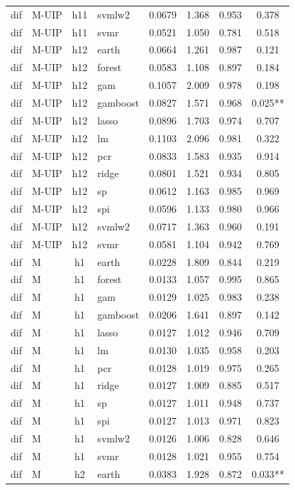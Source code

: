 \begin{ThreePartTable}
\begin{longtable}[t]{llclcccc}
dif & M-UIP & h11 & svmlw2 & 0.0679 & 1.368 & 0.953 & 0.378\\
dif & M-UIP & h11 & svmr & 0.0521 & 1.050 & 0.781 & 0.518\\
\addlinespace
dif & M-UIP & h12 & earth & 0.0664 & 1.261 & 0.987 & 0.121\\
dif & M-UIP & h12 & forest & 0.0583 & 1.108 & 0.897 & 0.184\\
dif & M-UIP & h12 & gam & 0.1057 & 2.009 & 0.978 & 0.198\\
dif & M-UIP & h12 & gamboost & 0.0827 & 1.571 & 0.968 & 0.025**\\
dif & M-UIP & h12 & lasso & 0.0896 & 1.703 & 0.974 & 0.707\\
dif & M-UIP & h12 & lm & 0.1103 & 2.096 & 0.981 & 0.322\\
dif & M-UIP & h12 & pcr & 0.0833 & 1.583 & 0.935 & 0.914\\
dif & M-UIP & h12 & ridge & 0.0801 & 1.521 & 0.934 & 0.805\\
dif & M-UIP & h12 & sp & 0.0612 & 1.163 & 0.985 & 0.969\\
dif & M-UIP & h12 & spi & 0.0596 & 1.133 & 0.980 & 0.966\\
dif & M-UIP & h12 & svmlw2 & 0.0717 & 1.363 & 0.960 & 0.191\\
dif & M-UIP & h12 & svmr & 0.0581 & 1.104 & 0.942 & 0.769\\
\addlinespace
dif & M & h1 & earth & 0.0228 & 1.809 & 0.844 & 0.219\\
dif & M & h1 & forest & 0.0133 & 1.057 & 0.995 & 0.865\\
dif & M & h1 & gam & 0.0129 & 1.025 & 0.983 & 0.238\\
dif & M & h1 & gamboost & 0.0206 & 1.641 & 0.897 & 0.142\\
dif & M & h1 & lasso & 0.0127 & 1.012 & 0.946 & 0.709\\
dif & M & h1 & lm & 0.0130 & 1.035 & 0.958 & 0.203\\
dif & M & h1 & pcr & 0.0128 & 1.019 & 0.975 & 0.265\\
dif & M & h1 & ridge & 0.0127 & 1.009 & 0.885 & 0.517\\
dif & M & h1 & sp & 0.0127 & 1.011 & 0.948 & 0.737\\
dif & M & h1 & spi & 0.0127 & 1.013 & 0.971 & 0.823\\
dif & M & h1 & svmlw2 & 0.0126 & 1.006 & 0.828 & 0.646\\
dif & M & h1 & svmr & 0.0128 & 1.021 & 0.955 & 0.754\\
\addlinespace
dif & M & h2 & earth & 0.0383 & 1.928 & 0.872 & 0.033**\\

\end{longtable}
\end{ThreePartTable}
